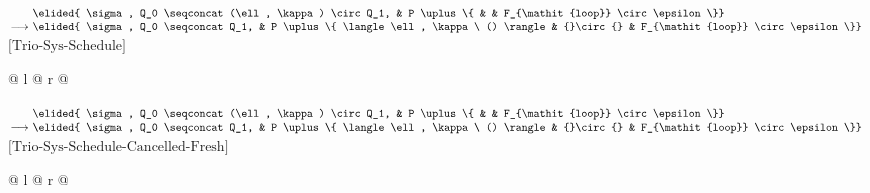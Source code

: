 \noindent
$\begin{array}[t]{@{}r@{\ }l@{\ }l@{}l@{}l@{}}
                & \elided{ \sigma, Q_0 \seqconcat (\ell, \kappa) \circ Q_1, & P \uplus \{ & & F_{\mathit{loop}} \circ \epsilon \}} \\
\longrightarrow & \elided{ \sigma, Q_0 \seqconcat Q_1, & P \uplus \{ \langle \ell, \kappa\ () \rangle & {}\circ{} & F_{\mathit{loop}} \circ \epsilon \}}
\end{array}$\hfill$\text{[Trio-Sys-Schedule]}$\par
\noindent
\begin{tabular*}{\linewidth}{@{} l @{\extracolsep{\fill}} r @{}}
\end{tabular*}

\vspace{1em}
\noindent
$\begin{array}[t]{@{}r@{\ }l@{\ }l@{}l@{}l@{}}
                & \elided{ \sigma, Q_0 \seqconcat (\ell, \kappa) \circ Q_1, & P \uplus \{ & & F_{\mathit{loop}} \circ \epsilon \}} \\
\longrightarrow & \elided{ \sigma, Q_0 \seqconcat Q_1, & P \uplus \{ \langle \ell, \kappa\ () \rangle & {}\circ{} & F_{\mathit{loop}} \circ \epsilon \}}
\end{array}$\hfill$\text{[Trio-Sys-Schedule-Cancelled-Fresh]}$\par
\noindent
\begin{tabular*}{\linewidth}{@{} l @{\extracolsep{\fill}} r @{}}
\end{tabular*}

